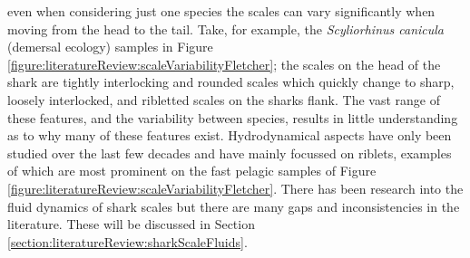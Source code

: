 \documentclass[12pt,oneside,a4paper]{article}
\begin{document}
even when considering just one species the scales can vary significantly when moving from the head to the tail. Take, for example, the \textit{Scyliorhinus canicula} (demersal ecology) samples in Figure \ref{figure:literatureReview:scaleVariabilityFletcher}; the scales on the head of the shark are tightly interlocking and rounded scales which quickly change to sharp, loosely interlocked, and ribletted scales on the sharks flank. The vast range of these features, and the variability between species, results in little understanding as to why many of these features exist. Hydrodynamical aspects have only been studied over the last few decades \citep{dean2010} and have mainly focussed on riblets, examples of which are most prominent on the fast pelagic samples of Figure \ref{figure:literatureReview:scaleVariabilityFletcher}. There has been research into the fluid dynamics of shark scales but there are many gaps and inconsistencies in the literature. These will be discussed in Section \ref{section:literatureReview:sharkScaleFluids}.
%
\end{document}

